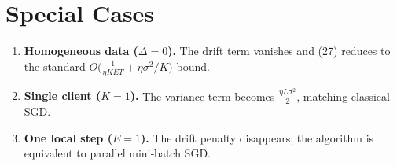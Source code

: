 \documentclass{article}
\begin{document}
\section*{Special Cases}
\begin{enumerate}
\item \textbf{Homogeneous data ($\Delta=0$).}  The drift term vanishes and (27) reduces to the standard $O\!\big(\frac{1}{\eta KET}+\eta\sigma^2/K\big)$ bound.
\item \textbf{Single client ($K=1$).}  The variance term becomes $\frac{\eta L\sigma^2}{2}$, matching classical SGD.
\item \textbf{One local step ($E=1$).}  The drift penalty disappears; the algorithm is equivalent to parallel mini‑batch SGD.
\end{enumerate}
\end{document}
